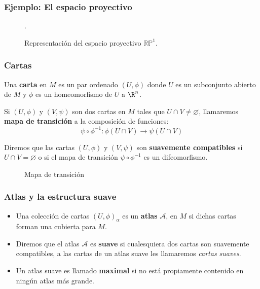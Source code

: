 \begin{frame}
	\frametitle{Ejemplo: El espacio proyectivo}
	\centering
	\begin{figure}
		\scalebox{0.75}{}
		\caption{Representación del espacio proyectivo $\mathbb{RP}^{1}$.}
		.\end{figure}
\end{frame}

\begin{frame}
	\frametitle{Cartas}
	\begin{definition}[Carta]
		Una \textbf{carta} en $M$ es un par ordenado $(U,\phi)$ donde $U$ es un subconjunto abierto de $M$ y $\phi$ es un homeomorfismo de $U$ a $\R^n$.
	\end{definition}\pause

	\begin{definition}
		Si $(U,\phi)$ y $(V,\psi)$ son dos cartas en $M$ tales que $U \cap V \neq \varnothing$, llamaremos \textbf{mapa de transición} a la composición de funciones:
		\[ \psi \circ \phi^{-1}: \phi(U \cap V) \to \psi(U \cap V) \]

		Diremos que las cartas $(U,\phi)$ y $(V,\psi)$ son \textbf{suavemente compatibles} si $U \cap V = \varnothing$ o si el mapa de transición $\psi \circ \phi^{-1}$ es un difeomorfismo.
	\end{definition}
\end{frame}

\begin{frame}
	\centering
	\begin{figure}
		
		\caption{Mapa de transición}
	\end{figure}
\end{frame}


\begin{frame}
	\frametitle{Atlas y la estructura suave}
	\begin{definition}
		\begin{itemize}
			\item Una colección de cartas $(U,\phi)_{\alpha}$ es un \textbf{atlas} $\mathcal{A}$, en $M$ si dichas cartas forman una cubierta para $M$.\pause
			\item Diremos que el atlas $\mathcal{A}$ es \textbf{suave} si cualesquiera dos cartas son suavemente compatibles, a las cartas de un atlas suave les llamaremos \textit{cartas suaves}.\pause
			\item Un atlas suave es llamado \textbf{maximal} si no está propiamente contenido en ningún atlas más grande.
		\end{itemize}
	\end{definition}

\end{frame}

